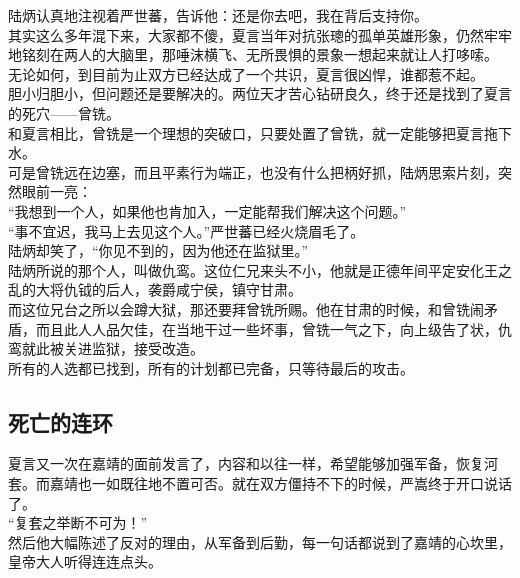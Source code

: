 \begin{multicols}{\theparacolNo}
陆炳认真地注视着严世蕃，告诉他：还是你去吧，我在背后支持你。\\

其实这么多年混下来，大家都不傻，夏言当年对抗张璁的孤单英雄形象，仍然牢牢地铭刻在两人的大脑里，那唾沫横飞、无所畏惧的景象一想起来就让人打哆嗦。\\

无论如何，到目前为止双方已经达成了一个共识，夏言很凶悍，谁都惹不起。\\

胆小归胆小，但问题还是要解决的。两位天才苦心钻研良久，终于还是找到了夏言的死穴——曾铣。\\

和夏言相比，曾铣是一个理想的突破口，只要处置了曾铣，就一定能够把夏言拖下水。\\

可是曾铣远在边塞，而且平素行为端正，也没有什么把柄好抓，陆炳思索片刻，突然眼前一亮：\\

“我想到一个人，如果他也肯加入，一定能帮我们解决这个问题。”\\

“事不宜迟，我马上去见这个人。”严世蕃已经火烧眉毛了。\\

陆炳却笑了，“你见不到的，因为他还在监狱里。”\\

陆炳所说的那个人，叫做仇鸾。这位仁兄来头不小，他就是正德年间平定安化王之乱的大将仇钺的后人，袭爵咸宁侯，镇守甘肃。\\

而这位兄台之所以会蹲大狱，那还要拜曾铣所赐。他在甘肃的时候，和曾铣闹矛盾，而且此人人品欠佳，在当地干过一些坏事，曾铣一气之下，向上级告了状，仇鸾就此被关进监狱，接受改造。\\

所有的人选都已找到，所有的计划都已完备，只等待最后的攻击。\\

\subsection{死亡的连环}
夏言又一次在嘉靖的面前发言了，内容和以往一样，希望能够加强军备，恢复河套。而嘉靖也一如既往地不置可否。就在双方僵持不下的时候，严嵩终于开口说话了。\\

“复套之举断不可为！”\\

然后他大幅陈述了反对的理由，从军备到后勤，每一句话都说到了嘉靖的心坎里，皇帝大人听得连连点头。\\


\end{multicols}
